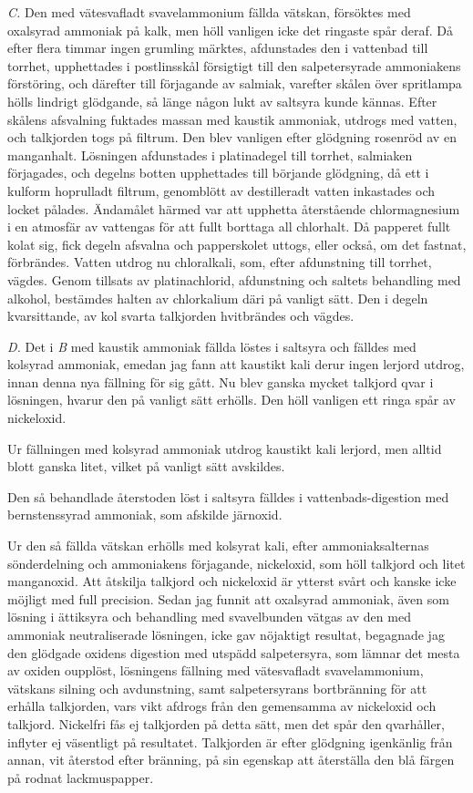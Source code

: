 \documentclass[a4paper, 12pt, oneside, swedish]{article}
\begin{document}
\emph{C.} Den med vätesvafladt svavelammonium fällda vätskan, försöktes med oxalsyrad ammoniak på kalk, men höll vanligen icke det ringaste spår deraf. Då efter flera timmar ingen grumling märktes, afdunstades den i vattenbad till torrhet, upphettades i postlinsskål försigtigt till den salpetersyrade ammoniakens förstöring, och därefter till förjagande av salmiak, varefter skålen över spritlampa hölls lindrigt glödgande, så länge någon lukt av saltsyra kunde kännas. Efter skålens afsvalning fuktades massan med kaustik ammoniak, utdrogs med vatten, och talkjorden togs på filtrum. Den blev vanligen efter glödgning rosenröd av en manganhalt. Lösningen afdunstades i platinadegel till torrhet, salmiaken förjagades, och degelns botten upphettades till börjande glödgning, då ett i kulform hoprulladt filtrum, genomblött av destilleradt vatten inkastades och locket pålades. Ändamålet härmed var att upphetta återstående chlormagnesium i en atmosfär av vattengas för att fullt borttaga all chlorhalt. Då papperet fullt kolat sig, fick degeln afsvalna och papperskolet uttogs, eller också, om det fastnat, förbrändes. Vatten utdrog nu chloralkali, som, efter afdunstning till torrhet, vägdes. Genom tillsats av platinachlorid, afdunstning och saltets behandling med alkohol, bestämdes halten av chlorkalium däri på vanligt sätt. Den i degeln kvarsittande, av kol svarta talkjorden hvitbrändes och vägdes.

\emph{D.} Det i \emph{B} med kaustik ammoniak fällda löstes i saltsyra och fälldes med kolsyrad ammoniak, emedan jag fann att kaustikt kali derur ingen lerjord utdrog, innan denna nya fällning för sig gått. Nu blev ganska mycket talkjord qvar i lösningen, hvarur den på vanligt sätt erhölls. Den höll vanligen ett ringa spår av nickeloxid.

Ur fällningen med kolsyrad ammoniak utdrog kaustikt kali lerjord, men alltid blott ganska litet, vilket på vanligt sätt avskildes.

Den så behandlade återstoden löst i saltsyra fälldes i vattenbads-digestion med bernstenssyrad ammoniak, som afskilde järnoxid.

Ur den så fällda vätskan erhölls med kolsyrat kali, efter ammoniaksalternas sönderdelning och ammoniakens förjagande, nickeloxid, som höll talkjord och litet manganoxid. Att åtskilja talkjord och nickeloxid är ytterst svårt och kanske icke möjligt med full precision. Sedan jag funnit att oxalsyrad ammoniak, även som lösning i ättiksyra och behandling med svavelbunden vätgas av den med ammoniak neutraliserade lösningen, icke gav nöjaktigt resultat, begagnade jag den glödgade oxidens digestion med utspädd salpetersyra, som lämnar det mesta av oxiden oupplöst, lösningens fällning med vätesvafladt svavelammonium, vätskans silning och avdunstning, samt salpetersyrans bortbränning för att erhålla talkjorden, vars vikt afdrogs från den gemensamma av nickeloxid och talkjord. Nickelfri fås ej talkjorden på detta sätt, men det spår den qvarhåller, inflyter ej väsentligt på resultatet. Talkjorden är efter glödgning igenkänlig från annan, vit återstod efter bränning, på sin egenskap att återställa den blå färgen på rodnat lackmuspapper.
\end{document}
